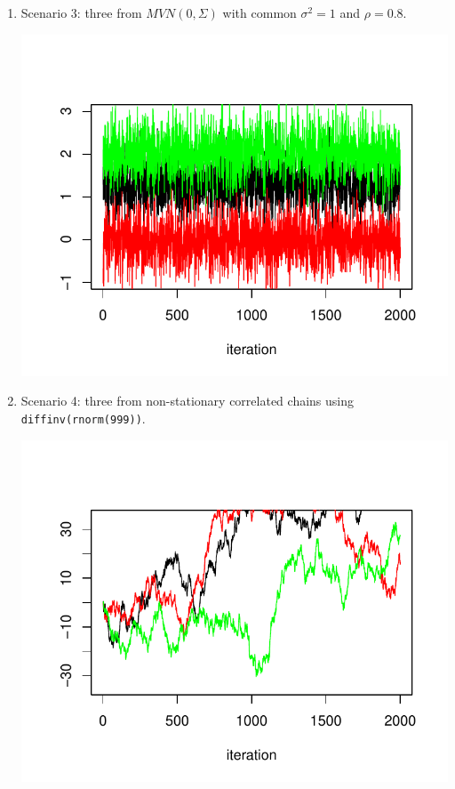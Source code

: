 \documentclass[12pt]{article}\usepackage[]{graphicx}\usepackage[]{color}
\newenvironment{knitrout}{}{} %
\begin{document}
\begin{doublespacing}
\begin{enumerate}
\begin{enumerate}
\begin{enumerate}
\begin{center}
\begin{knitrout}
\end{knitrout}
\end{center}

\item Scenario 3: three from $MVN(0, \Sigma)$ with common $\sigma^2=1$ and $\rho=0.8$. 
\begin{center}
\begin{knitrout}\footnotesize
{}\color{fgcolor}
\includegraphics[width=.5\linewidth]{figure/mvnorms} 

\end{knitrout}
\end{center}

\item Scenario 4: three from non-stationary correlated chains using \verb+diffinv(rnorm(999))+.
\begin{center}
\begin{knitrout}\footnotesize
{}\color{fgcolor}
\includegraphics[width=.5\linewidth]{figure/diffinvnorms} 

\end{knitrout}
\end{center}


\end{enumerate}
\end{enumerate}
\end{enumerate}
\end{doublespacing}
\end{document}

